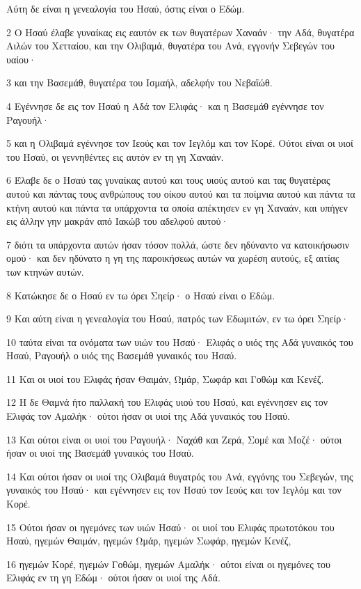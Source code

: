 \par Αύτη δε είναι η γενεαλογία του Ησαύ, όστις είναι ο Εδώμ.
\par 2 Ο Ησαύ έλαβε γυναίκας εις εαυτόν εκ των θυγατέρων Χαναάν· την Αδά, θυγατέρα Αιλών του Χετταίου, και την Ολιβαμά, θυγατέρα του Ανά, εγγονήν Σεβεγών του υαίου·
\par 3 και την Βασεμάθ, θυγατέρα του Ισμαήλ, αδελφήν του Νεβαϊώθ.
\par 4 Εγέννησε δε εις τον Ησαύ η Αδά τον Ελιφάς· και η Βασεμάθ εγέννησε τον Ραγουήλ·
\par 5 και η Ολιβαμά εγέννησε τον Ιεούς και τον Ιεγλόμ και τον Κορέ. Ούτοι είναι οι υιοί του Ησαύ, οι γεννηθέντες εις αυτόν εν τη γη Χαναάν.
\par 6 Έλαβε δε ο Ησαύ τας γυναίκας αυτού και τους υιούς αυτού και τας θυγατέρας αυτού και πάντας τους ανθρώπους του οίκου αυτού και τα ποίμνια αυτού και πάντα τα κτήνη αυτού και πάντα τα υπάρχοντα τα οποία απέκτησεν εν γη Χαναάν, και υπήγεν εις άλλην γην μακράν από Ιακώβ του αδελφού αυτού·
\par 7 διότι τα υπάρχοντα αυτών ήσαν τόσον πολλά, ώστε δεν ηδύναντο να κατοικήσωσιν ομού· και δεν ηδύνατο η γη της παροικήσεως αυτών να χωρέση αυτούς, εξ αιτίας των κτηνών αυτών.
\par 8 Κατώκησε δε ο Ησαύ εν τω όρει Σηείρ· ο Ησαύ είναι ο Εδώμ.
\par 9 Και αύτη είναι η γενεαλογία του Ησαύ, πατρός των Εδωμιτών, εν τω όρει Σηείρ·
\par 10 ταύτα είναι τα ονόματα των υιών του Ησαύ· Ελιφάς ο υιός της Αδά γυναικός του Ησαύ, Ραγουήλ ο υιός της Βασεμάθ γυναικός του Ησαύ.
\par 11 Και οι υιοί του Ελιφάς ήσαν Θαιμάν, Ωμάρ, Σωφάρ και Γοθώμ και Κενέζ.
\par 12 Η δε Θαμνά ήτο παλλακή του Ελιφάς υιού του Ησαύ, και εγέννησεν εις τον Ελιφάς τον Αμαλήκ· ούτοι ήσαν οι υιοί της Αδά γυναικός του Ησαύ.
\par 13 Και ούτοι είναι οι υιοί του Ραγουήλ· Ναχάθ και Ζερά, Σομέ και Μοζέ· ούτοι ήσαν οι υιοί της Βασεμάθ γυναικός του Ησαύ.
\par 14 Και ούτοι ήσαν οι υιοί της Ολιβαμά θυγατρός του Ανά, εγγόνης του Σεβεγών, της γυναικός του Ησαύ· και εγέννησεν εις τον Ησαύ τον Ιεούς και τον Ιεγλόμ και τον Κορέ.
\par 15 Ούτοι ήσαν οι ηγεμόνες των υιών Ησαύ· οι υιοί του Ελιφάς πρωτοτόκου του Ησαύ, ηγεμών Θαιμάν, ηγεμών Ωμάρ, ηγεμών Σωφάρ, ηγεμών Κενέζ,
\par 16 ηγεμών Κορέ, ηγεμών Γοθώμ, ηγεμών Αμαλήκ· ούτοι είναι οι ηγεμόνες του Ελιφάς εν τη γη Εδώμ· ούτοι ήσαν οι υιοί της Αδά.
